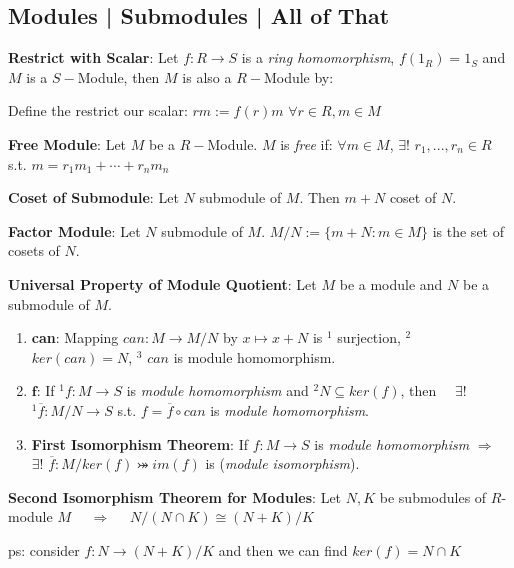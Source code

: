 \documentclass[9pt]{article}
\begin{document}
\subsection{Modules | Submodules | All of That} %

\textbf{Restrict with Scalar}: Let $f:R\to S$ is a \textit{ring homomorphism}, $f(1_R)=1_S$ and $M$ is a $S-$Module, then $M$ is also a $R-$Module by:

\quad Define the restrict our scalar: $rm:=f(r)m$ \quad $\forall r\in R,m\in M$ 

\textbf{Free Module}: Let $M$ be a $R-$Module. $M$ is \textit{free} if: $\forall m\in M$, $\exists!$ $r_1,...,r_n\in R$ s.t. $m=r_1m_1+\cdots+r_nm_n$ 

\textbf{Coset of Submodule}: Let $N$ submodule of $M$. Then $m+N$ coset of $N$. 

\textbf{Factor Module}: Let $N$ submodule of $M$. $M/N:=\{m+N:m\in M\}$ is the set of cosets of $N$.


\textbf{Universal Property of Module Quotient}: Let $M$ be a module and $N$ be a submodule of $M$. 
\begin{enumerate}[itemsep=-2pt, topsep=-2pt]
    \item \textbf{can}: Mapping $can:M\to M/N$ by $x\mapsto x+N$ is $^1$ surjection, $^2$ $ker(can)=N$, $^3$ $can$ is module homomorphism.
    \item \textbf{$\textbf{f}$}: If $^1f:M\to S$ is \textit{module homomorphism} and $^2N\subseteq ker(f)$, then \ \ $\exists!$ $^1\overline{f}:M/N\to S$ s.t. $f=\overline{f}\circ can$ is \textit{module homomorphism}.
    \item \textbf{First Isomorphism Theorem}: If $f:M\to S$ is \textit{module homomorphism} $\Rightarrow$ $\exists!$ $\overline{f}:M/ker(f)\bij im(f)$ is  (\textit{module isomorphism}).
\end{enumerate}

\vspace{2pt}
\np\textbf{Second Isomorphism Theorem for Modules}: Let $N,K$ be submodules of $R$-module $M$ \ \ $\Rightarrow$ \ \ $N/(N\cap K)\cong (N+K)/K$

\quad ps: {\footnotesize consider $f:N\to (N+K)/K$ and then we can find $ker(f)=N\cap K$}
\end{document}
